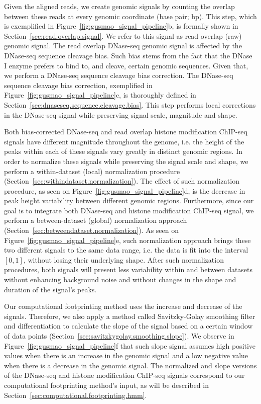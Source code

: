 Given the aligned reads, we create genomic signals by counting the overlap between these reads at every genomic coordinate (base pair; bp). This step, which is exemplified in Figure~\ref{fig:gusmao_signal_pipeline}b, is formally shown in Section~\ref{sec:read.overlap.signal}. We refer to this signal as read overlap (raw) genomic signal. The read overlap DNase-seq genomic signal is affected by the DNase-seq sequence cleavage bias. Such bias stems from the fact that the DNase I enzyme prefers to bind to, and cleave, certain genomic sequences. Given that, we perform a DNase-seq sequence cleavage bias correction. The DNase-seq sequence cleavage bias correction, exemplified in Figure~\ref{fig:gusmao_signal_pipeline}c, is thoroughly defined in Section~\ref{sec:dnaseseq.sequence.cleavage.bias}. This step performs local corrections in the DNase-seq signal while preserving signal scale, magnitude and shape.

Both bias-corrected DNase-seq and read overlap histone modification ChIP-seq signals have different magnitude throughout the genome, i.e. the height of the peaks within each of these signals vary greatly in distinct genomic regions. In order to normalize these signals while preserving the signal scale and shape, we perform a within-dataset (local) normalization procedure (Section~\ref{sec:withindataset.normalization}). The effect of such normalization procedure, as seen on Figure~\ref{fig:gusmao_signal_pipeline}d, is the decrease in peak height variability between different genomic regions. Furthermore, since our goal is to integrate both DNase-seq and histone modification ChIP-seq signal, we perform a between-dataset (global) normalization approach (Section~\ref{sec:betweendataset.normalization}). As seen on Figure~\ref{fig:gusmao_signal_pipeline}e, such normalization approach brings these two different signals to the same data range, i.e. the data is fit into the interval $[0,1]$, without losing their underlying shape. After such normalization procedures, both signals will present less variability within and between datasets without enhancing background noise and without changes in the shape and duration of the signal's peaks.

Our computational footprinting method uses the increase and decrease of the signals. Therefore, we also apply a method called Savitzky-Golay smoothing filter and differentiation to calculate the slope of the signal based on a certain window of data points (Section~\ref{sec:savitzkygolay.smoothing.slope}). We observe in Figure~\ref{fig:gusmao_signal_pipeline}f that such slope signal assumes high positive values when there is an increase in the genomic signal and a low negative value when there is a decrease in the genomic signal. The normalized and slope versions of the DNase-seq and histone modification ChIP-seq signals correspond to our computational footprinting method's input, as will be described in Section~\ref{sec:computational.footprinting.hmm}.

